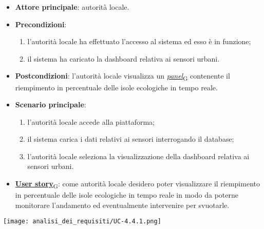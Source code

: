 \begin{itemize}
	\item \textbf{Attore principale}: autorità locale.
	\item \textbf{Precondizioni}:
	      \begin{enumerate}
		      \item l'autorità locale ha effettuato l'accesso al sistema ed esso è in funzione;
		      \item il sistema ha caricato la dashboard relativa ai sensori urbani.
	      \end{enumerate}
	\item \textbf{Postcondizioni}: l'autorità locale visualizza un \href{https://7last.github.io/docs/pb/documentazione-interna/glossario\#panel}{\textit{panel}\textsubscript{G}} contenente il riempimento in percentuale delle isole ecologiche in tempo reale.
	\item \textbf{Scenario principale}:
	      \begin{enumerate}
		      \item l'autorità locale accede alla piattaforma;
		      \item il sistema carica i dati relativi ai sensori interrogando il database;
		      \item l'autorità locale seleziona la visualizzazione della dashboard relativa ai sensori urbani.
	      \end{enumerate}
	\item \href{https://7last.github.io/docs/pb/documentazione-interna/glossario\#user-story}{\textbf{User story}\textsubscript{G}}:
	      come autorità locale desidero poter visualizzare il riempimento in percentuale delle isole ecologiche in tempo reale in modo da poterne monitorare l'andamento
	      ed eventualmente intervenire per svuotarle.
\end{itemize}
\begin{center}
	\texttt{[image: analisi\_dei\_requisiti/UC-4.4.1.png]}
\end{center}


